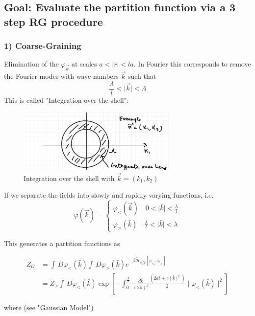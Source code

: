 \documentclass[../../Main/Main.tex]{subfiles}
\begin{document}
\subsection*{Goal: Evaluate the partition function via a 3 step RG procedure}

\subsubsection{1) Coarse-Graining}

Elimination of the $\varphi_{\vec{k}}$ at scales $a < \mid \bar{r}\mid<la$. In Fourier this corresponds to remove the Fourier modes with wave numbers $\vec{k}$ such that
$$\frac{\Lambda}{l} < \mid \vec{k}\mid < \Lambda$$
This is called "Integration over the shell":

\begin{figure}[H]
\centering
\includegraphics[width=0.7\textwidth]{./img/IMG2.png}
\caption{Integration over the shell with $\vec{k} = (k_{1},k_{2})$}
\end{figure}


If we separate the fields into slowly and rapidly varying functions, i.e.
$$\varphi(\vec{k}) = \left\{
\begin{aligned}
\varphi_{<}(\vec{k}) \quad 0 < \mid \bar{k}\mid < \frac{\lambda}{l} \\
\varphi_{>}(\bar{k})  \quad  \frac{\lambda}{l} < \mid \bar{k}\mid < \lambda
\end{aligned}
\right.$$

This generates a partition functions as

$$\begin{align}
\tilde{Z}_{G} &= \int  \, D\varphi_{<}(\bar{k})\int  \, D\varphi_{>}(\bar{k})e^{-\beta  \tilde{\mathcal{H}}_{eff}[\varphi_{<},\varphi_{>}]}  \\
&= \tilde{Z}_{>}\int  \, D\varphi_{<}(\bar{k}) \exp\left[ - \int_{0}^{\frac{\Lambda}{l}} \, \frac{d\bar{k}}{(2\pi)^{d}}\frac{(2at + c\mid \bar{k}\mid^{2})}{2} \mid \varphi_{<}(\bar{k})\mid^{2}  \right]
\end{align}$$

where (see "Gaussian Model")
\end{document}
